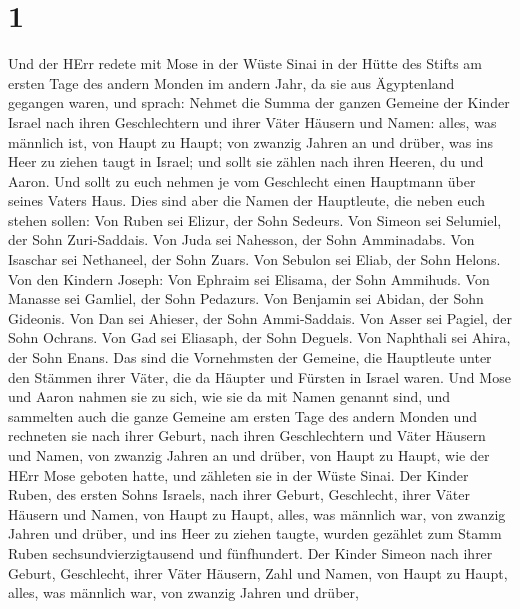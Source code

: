 \hypertarget{section}{%
\section{1}\label{section}}

 Und der HErr redete mit Mose in der Wüste Sinai in der
Hütte des Stifts am ersten Tage des andern Monden im andern Jahr, da sie
aus Ägyptenland gegangen waren, und sprach:  Nehmet die
Summa der ganzen Gemeine der Kinder Israel nach ihren Geschlechtern und
ihrer Väter Häusern und Namen: alles, was männlich ist, von Haupt zu
Haupt;  von zwanzig Jahren an und drüber, was ins Heer zu
ziehen taugt in Israel; und sollt sie zählen nach ihren Heeren, du und
Aaron.  Und sollt zu euch nehmen je vom Geschlecht einen
Hauptmann über seines Vaters Haus.  Dies sind aber die Namen
der Hauptleute, die neben euch stehen sollen: Von Ruben sei Elizur, der
Sohn Sedeurs.  Von Simeon sei Selumiel, der Sohn
Zuri-Saddais.  Von Juda sei Nahesson, der Sohn Amminadabs.
 Von Isaschar sei Nethaneel, der Sohn Zuars. 
Von Sebulon sei Eliab, der Sohn Helons.  Von den Kindern
Joseph: Von Ephraim sei Elisama, der Sohn Ammihuds. Von Manasse sei
Gamliel, der Sohn Pedazurs.  Von Benjamin sei Abidan, der
Sohn Gideonis.  Von Dan sei Ahieser, der Sohn Ammi-Saddais.
 Von Asser sei Pagiel, der Sohn Ochrans.  Von
Gad sei Eliasaph, der Sohn Deguels.  Von Naphthali sei
Ahira, der Sohn Enans.  Das sind die Vornehmsten der
Gemeine, die Hauptleute unter den Stämmen ihrer Väter, die da Häupter
und Fürsten in Israel waren.  Und Mose und Aaron nahmen sie
zu sich, wie sie da mit Namen genannt sind,  und sammelten
auch die ganze Gemeine am ersten Tage des andern Monden und rechneten
sie nach ihrer Geburt, nach ihren Geschlechtern und Väter Häusern und
Namen, von zwanzig Jahren an und drüber, von Haupt zu Haupt,
 wie der HErr Mose geboten hatte, und zähleten sie in der
Wüste Sinai.  Der Kinder Ruben, des ersten Sohns Israels,
nach ihrer Geburt, Geschlecht, ihrer Väter Häusern und Namen, von Haupt
zu Haupt, alles, was männlich war, von zwanzig Jahren und drüber, und
ins Heer zu ziehen taugte,  wurden gezählet zum Stamm Ruben
sechsundvierzigtausend und fünfhundert.  Der Kinder Simeon
nach ihrer Geburt, Geschlecht, ihrer Väter Häusern, Zahl und Namen, von
Haupt zu Haupt, alles, was männlich war, von zwanzig Jahren und drüber,
